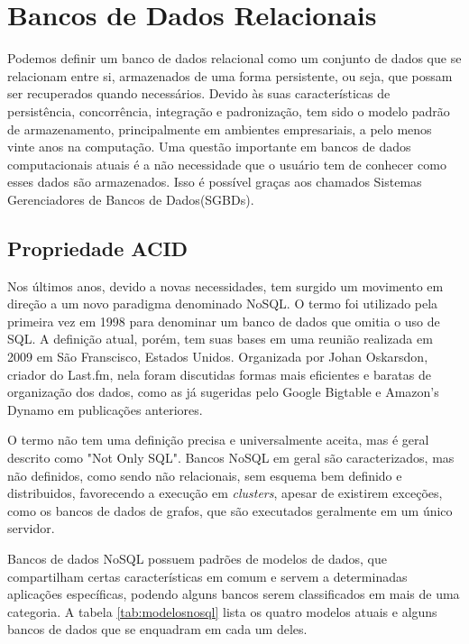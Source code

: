 \chapter{Bancos de Dados Relacionais}

Podemos definir um banco de dados relacional como um conjunto de dados que se relacionam entre si, armazenados de uma forma persistente, ou seja, que possam ser recuperados quando necessários. Devido às suas características de persistência, concorrência, integração e padronização, tem sido o modelo padrão de armazenamento, principalmente em ambientes empresariais, a pelo menos vinte anos na computação\cite{pramod}. Uma questão importante em bancos de dados computacionais atuais é a não necessidade que o usuário tem de conhecer como esses dados são armazenados. Isso é possível graças aos chamados Sistemas Gerenciadores de Bancos de Dados(SGBDs)\cite{jan}.

\section{Propriedade ACID}
Nos últimos anos, devido a novas necessidades, tem surgido um movimento em direção a um novo paradigma denominado NoSQL. O termo foi utilizado pela primeira vez em 1998 para denominar um banco de dados que omitia o uso de SQL. A definição atual, porém, tem suas bases em uma reunião realizada em 2009 em São Franscisco, Estados Unidos. Organizada por Johan Oskarsdon, criador do Last.fm, nela foram discutidas formas mais eficientes e baratas de organização dos dados, como as já sugeridas pelo Google Bigtable e Amazon's Dynamo em publicações anteriores\cite{chrisnosql}.

O termo não tem uma definição precisa e universalmente aceita, mas é geral descrito como "Not Only SQL". Bancos NoSQL em geral são caracterizados, mas não definidos, como sendo não relacionais, sem esquema bem definido e distribuidos, favorecendo a execução em \emph{clusters}, apesar de existirem exceções, como os bancos de dados de grafos, que são executados geralmente em um único servidor.

Bancos de dados NoSQL possuem padrões de modelos de dados, que compartilham certas características em comum e servem a determinadas aplicações específicas, podendo alguns bancos serem classificados em mais de uma categoria. A tabela \ref{tab:modelosnosql} lista os quatro modelos atuais e alguns bancos de dados que se enquadram em cada um deles.

